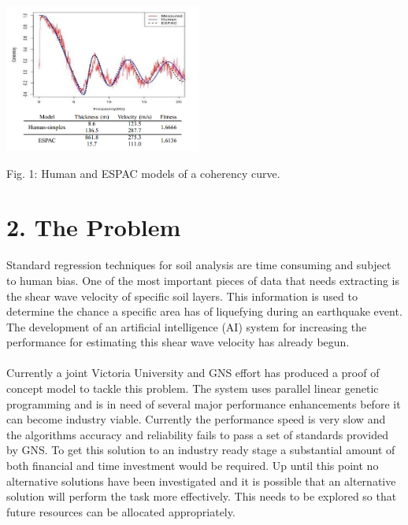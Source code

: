 \documentclass[11pt, a4paper, twoside, openright]{report}
\begin{document}
\begin{center}
 \includegraphics[width=244,height=184]{./fig1.png}
 \end{center}
 \begin{center}
Fig. 1: Human and ESPAC models of a coherency curve.
\end{center}


\section*{2. The Problem}

Standard regression techniques for soil analysis are time consuming and subject to human bias. One of the most important pieces of data that needs extracting is the shear wave velocity of specific soil layers. This information is used to determine the chance a specific area has of liquefying during an earthquake event\cite{andrus1}. The development of an artificial intelligence (AI) system for increasing the performance for estimating this shear wave velocity has already
begun. \\
\\
Currently a joint Victoria University and GNS effort has produced a proof of concept
model to tackle this problem. The system uses parallel linear genetic programming and is in need of
several major performance enhancements before it can become industry viable. Currently the performance speed is very slow and the algorithms accuracy and reliability fails to pass a set of standards provided by GNS. To get this solution to an industry ready stage a substantial amount of both financial and time investment would be required. Up until
this point no alternative solutions have been investigated and it is possible that an alternative solution will
perform the task more effectively. This needs to be explored so that future resources can be allocated appropriately.
\end{document}

